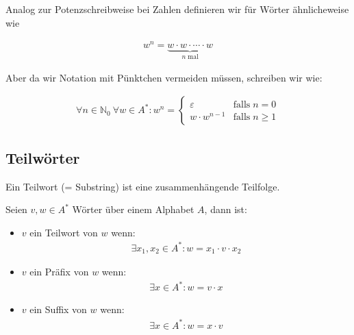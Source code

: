 \documentclass[12pt,a4paper,oneside]{article}
\newcommand{\emptyline}{\hspace*{\fill}}
\newcommand{\N}{\mathbb{N}}
\newcommand{\If}[1]{\text{falls}\; #1}
\begin{document}
            Analog zur Potenzschreibweise bei Zahlen definieren wir für Wörter ähnlicheweise wie

            \vspace{-1em}
            \begin{align*}
                w^n = \underbrace{w \cdot w \cdot \cdots \cdot w}_{n \;\text{mal}}
            \end{align*}

            Aber da wir Notation mit Pünktchen vermeiden müssen, schreiben wir wie:

            \vspace{-1em}
            \begin{align*}
                \forall n \in \N_0\ \forall w \in A^*: w^n =
                \begin{cases}
                    \varepsilon     &\If{n = 0} \\
                    w \cdot w^{n-1} &\If{n \geq 1}
                \end{cases}
            \end{align*}
        
        \subsection{Teilwörter}

            Ein Teilwort (= Substring) ist eine zusammenhängende Teilfolge.

            \emptyline

            Seien $v, w \in A^*$ Wörter über einem Alphabet $A$, dann ist:

            \begin{itemize}
                \item $v$ ein Teilwort von $w$ wenn:
                    \begin{align*}
                        \exists x_1, x_2 \in A^*: w = x_1 \cdot v \cdot x_2
                    \end{align*}
                \item $v$ ein Präfix von $w$ wenn:
                    \begin{align*}
                        \exists x \in A^*: w = v \cdot x
                    \end{align*}
                \item $v$ ein Suffix von $w$ wenn:
                    \begin{align*}
                        \exists x \in A^*: w = x \cdot v
                    \end{align*}
            \end{itemize}
\end{document}
